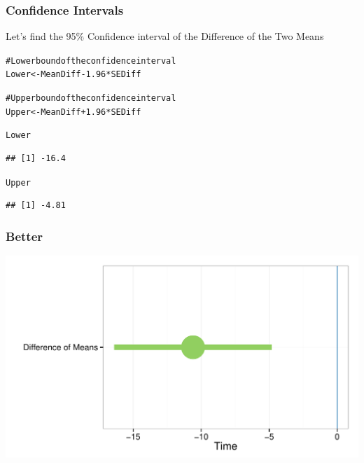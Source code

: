 \documentclass{beamer}\usepackage{graphicx, color}
\makeatletter
\def\maxwidth{ %
  \ifdim\Gin@nat@width>\linewidth
    \linewidth
  \else
    \Gin@nat@width
  \fi
}
\newcommand{\hlcomment}[1]{\textcolor[rgb]{0.180392156862745,0.6,0.341176470588235}{#1}}%
\newenvironment{kframe}{%
 \def\at@end@of@kframe{}%
 \ifinner\ifhmode%
  \def\at@end@of@kframe{\end{minipage}}%
  \begin{minipage}{\columnwidth}%
 \fi\fi%
 \def\FrameCommand##1{\hskip\@totalleftmargin \hskip-\fboxsep
 \colorbox{shadecolor}{##1}\hskip-\fboxsep
     \hskip-\linewidth \hskip-\@totalleftmargin \hskip\columnwidth}%
 \MakeFramed {\advance\hsize-\width
   \@totalleftmargin\z@ \linewidth\hsize
   \@setminipage}}%
 {\par\unskip\endMakeFramed%
 \at@end@of@kframe}
\newenvironment{knitrout}{}{} %
\makeatother
\begin{document}
\begin{frame}[fragile]
  \frametitle{Confidence Intervals}
{\Large{Let's find the 95\% Confidence interval of the Difference of the Two Means}}
\begin{knitrout}
\color{fgcolor}\begin{kframe}
\begin{alltt}
\hlcomment{# Lower bound of the confidence interval}
Lower <- MeanDiff - 1.96 * SEDiff

\hlcomment{# Upper bound of the confidence interval}
Upper <- MeanDiff + 1.96 * SEDiff

Lower
\end{alltt}
\begin{verbatim}
## [1] -16.4
\end{verbatim}
\begin{alltt}
Upper
\end{alltt}
\begin{verbatim}
## [1] -4.81
\end{verbatim}
\end{kframe}
\end{knitrout}

\end{frame}

\begin{frame}[fragile]
  \frametitle{Better}
\begin{knitrout}
\color{fgcolor}

{\centering \includegraphics[width=\maxwidth]{figure/PlotCIDiffMeans} 

}


\end{knitrout}

\end{frame}
\end{document}
